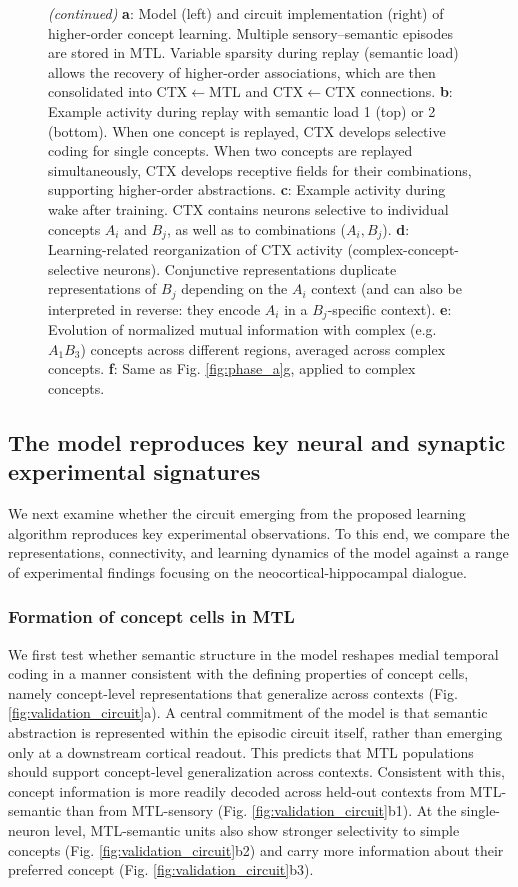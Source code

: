 \documentclass{article}
\begin{document}
\begin{figure}[h!]
  \ContinuedFloat
  \captionsetup{list=off} %
  \caption{\textit{(continued)} \textbf{a}: Model (left) and circuit implementation (right) of higher-order concept learning. Multiple sensory--semantic episodes are stored in MTL. Variable sparsity during replay (semantic load) allows the recovery of higher-order associations, which are then consolidated into CTX$\leftarrow$MTL and CTX$\leftarrow$CTX connections. \textbf{b}: Example activity during replay with semantic load 1 (top) or 2 (bottom). When one concept is replayed, CTX develops selective coding for single concepts. When two concepts are replayed simultaneously, CTX develops receptive fields for their combinations, supporting higher-order abstractions.  
\textbf{c}: Example activity during wake after training. CTX contains neurons selective to individual concepts $A_i$ and $B_j$, as well as to combinations ($A_i, B_j$).  
\textbf{d}: Learning-related reorganization of CTX activity (complex-concept-selective neurons). Conjunctive representations duplicate representations of $B_j$ depending on the $A_i$ context (and can also be interpreted in reverse: they encode \(A_i\) in a \(B_j\)-specific context).
\textbf{e}: Evolution of normalized mutual information with complex (e.g. $A_1B_3$) concepts across different regions, averaged across complex concepts. \textbf{f}: Same as Fig. \ref{fig:phase_a}g, applied to complex concepts.}
\end{figure}
\subsection*{The model reproduces key neural and synaptic experimental signatures}
We next examine whether the circuit emerging from the proposed learning algorithm reproduces key experimental observations. To this end, we compare the representations, connectivity, and learning dynamics of the model against a range of experimental findings focusing on the neocortical-hippocampal dialogue.
\subsubsection*{Formation of concept cells in MTL}
We first test whether semantic structure in the model reshapes medial temporal coding in a manner consistent with the defining properties of concept cells, namely concept-level representations that generalize across contexts (Fig. \ref{fig:validation_circuit}a). A central commitment of the model is that semantic abstraction is represented within the episodic circuit itself, rather than emerging only at a downstream cortical readout. This predicts that MTL populations should support concept-level generalization across contexts. Consistent with this, concept information is more readily decoded across held-out contexts from MTL-semantic than from MTL-sensory (Fig. \ref{fig:validation_circuit}b1). At the single-neuron level, MTL-semantic units also show stronger selectivity to simple concepts (Fig. \ref{fig:validation_circuit}b2) and carry more information about their preferred concept (Fig. \ref{fig:validation_circuit}b3).
\end{document}
